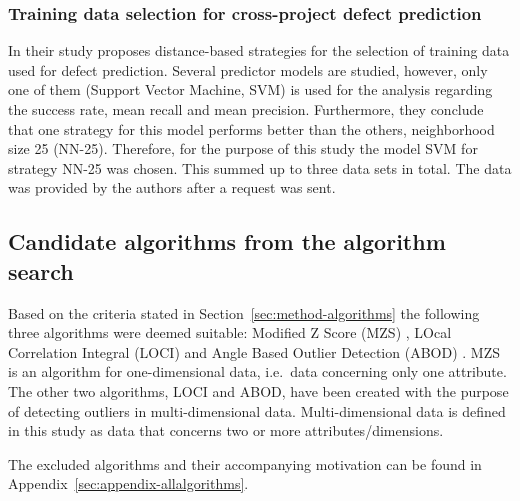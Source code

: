 \subsubsection{Training data selection for cross-project defect prediction}
In their study \citet{herbold2013training} proposes distance-based strategies for the selection of training data used for defect prediction. Several predictor models are studied, however, only one of them (Support Vector Machine, SVM) is used for the analysis regarding the success rate, mean recall and mean precision. Furthermore, they conclude that one strategy for this model performs better than the others, neighborhood size 25 (NN-25). Therefore, for the purpose of this study the model SVM for strategy NN-25 was chosen. This summed up to three data sets in total. The data was provided by the authors after a request was sent.




\subsection{Candidate algorithms from the algorithm search}
\label{sec:resultsprestudy-algorithms}
Based on the criteria stated in Section~\ref{sec:method-algorithms} the following three algorithms were deemed suitable: Modified Z Score (MZS) \citep{garcia2012tests}, LOcal Correlation Integral (LOCI) \citep{papadimitriou2003loci} and Angle Based Outlier Detection (ABOD) \citep{kriegel2008angle}. MZS is an algorithm for one-dimensional data, i.e.\ data concerning only one attribute. The other two algorithms, LOCI and ABOD, have been created with the purpose of detecting outliers in multi-dimensional data. Multi-dimensional data is defined in this study as data that concerns two or more attributes\slash dimensions.




The excluded algorithms and their accompanying motivation can be found in Appendix~\ref{sec:appendix-allalgorithms}.




